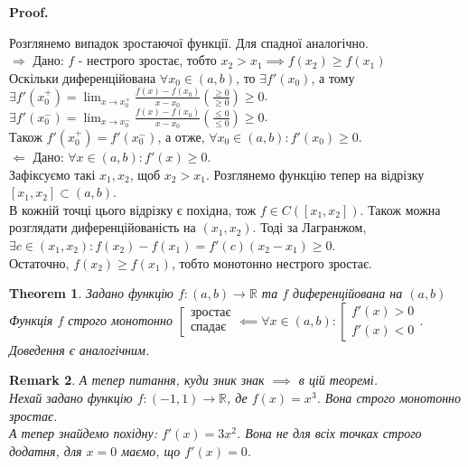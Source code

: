 \documentclass[a4paper, 14pt]{article}
\makeatletter
\def\qed{$\blacksquare$}
\def\rightproof{$\boxed{\Rightarrow}$ }
\def\leftproof{$\boxed{\Leftarrow}$ }
\theoremstyle{theoremdd}
\newtheorem{theorem}{Theorem}[subsection]
\theoremstyle{theoremdd}
\theoremstyle{theoremdd}
\theoremstyle{theoremdd}
\theoremstyle{theoremdd}
\theoremstyle{theoremdd}
\newtheorem{remark}[theorem]{Remark}
\theoremstyle{theoremdd}
\theoremstyle{theoremdd}
\renewenvironment{proof}[1][Proof.\\]{\par
\pushQED{\hfill \qed}%
\normalfont \topsep6\p@\@plus6\p@\relax
\trivlist
\item\relax
{\bfseries
#1\@addpunct{.}}\hspace\labelsep\ignorespaces
}{%
\popQED\endtrivlist\@endpefalse
}
\makeatother
\begin{document}
\begin{proof}
Розглянемо випадок зростаючої функції. Для спадної аналогічно.\\
\rightproof Дано: $f$ - нестрого зростає, тобто $x_2 > x_1 \implies f(x_2) \geq f(x_1)$\\
Оскільки диференційована $\forall x_0 \in (a,b)$, то $\exists f'(x_0)$, а тому \\ 
$\exists f'(x_0^+) = \displaystyle \lim_{x \to x_0^+} \frac{f(x)-f(x_0)}{x-x_0} \left( \frac{\geq 0}{\geq 0} \right) \geq 0$.\\
$\exists f'(x_0^-) = \displaystyle \lim_{x \to x_0^-} \frac{f(x)-f(x_0)}{x-x_0} \left( \frac{\leq 0}{\leq 0} \right) \geq 0$.\\
Також $f'(x_0^+) = f'(x_0^-)$, а отже, $\forall x_0 \in (a,b): f'(x_0) \geq 0$.
\bigskip \\
\leftproof Дано: $\forall x \in (a,b): f'(x) \geq 0$.\\
Зафіксуємо такі $x_1,x_2$, щоб $x_2 > x_1$. Розглянемо функцію тепер на відрізку $[x_1,x_2] \subset (a,b)$.\\
В кожній точці цього відрізку є похідна, тож $f \in C([x_1,x_2])$. Також можна розглядати диференційованість на $(x_1,x_2)$. Тоді за Лагранжом,\\
$\exists c \in (x_1,x_2): f(x_2)-f(x_1) = f'(c)(x_2-x_1) \geq 0$.\\
Остаточно, $f(x_2) \geq f(x_1)$, тобто монотонно нестрого зростає.
\end{proof}

\begin{theorem}
Задано функцію $f: (a,b) \to \mathbb{R}$ та $f$ диференційована на $(a,b)$\\
Функція $f$ строго монотонно $\left[ \begin{gathered} \textrm{зростає} \\ \textrm{спадає} \end{gathered} \right. \impliedby \forall x \in (a,b): \left[ \begin{gathered} f'(x) > 0 \\ f'(x) < 0 \end{gathered} \right.$.\\
\textit{Доведення є аналогічним.}
\end{theorem}

\begin{remark}
А тепер питання, куди зник знак $\implies$ в цій теоремі.\\
Нехай задано функцію $f: (-1,1) \to \mathbb{R}$, де $f(x) = x^3$. Вона строго монотонно зростає.\\
А тепер знайдемо похідну: $f'(x) = 3x^2$. Вона не для всіх точках строго додатня, для $x = 0$ маємо, що $f'(x) = 0$.
\end{remark}
\end{document}
